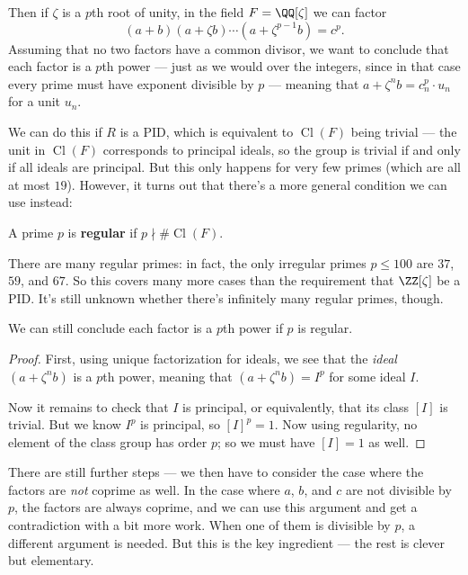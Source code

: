 Then if $\zeta$ is a $p$th root of unity, in the field $F = \QQ[\zeta]$ we can factor \[(a + b)(a + \zeta b)\cdots (a + \zeta^{p - 1}b) = c^p.\] Assuming that no two factors have a common divisor, we want to conclude that each factor is a $p$th power --- just as we would over the integers, since in that case every prime must have exponent divisible by $p$ --- meaning that $a + \zeta^nb = c_n^p \cdot u_n$ for a unit $u_n$. 

We can do this if $R$ is a PID, which is equivalent to $\operatorname{Cl}(F)$ being trivial --- the unit in $\operatorname{Cl}(F)$ corresponds to principal ideals, so the group is trivial if and only if all ideals are principal. But this only happens for very few primes (which are all at most $19$). However, it turns out that there's a more general condition we can use instead:

\begin{definition}
    A prime $p$ is \textbf{regular} if $p \nmid \#\operatorname{Cl}(F)$. 
\end{definition}

There are many regular primes: in fact, the only irregular primes $p \leq 100$ are $37$, $59$, and $67$. So this covers many more cases than the requirement that $\ZZ[\zeta]$ be a PID. It's still unknown whether there's infinitely many regular primes, though.

\begin{proposition}
    We can still conclude each factor is a $p$th power if $p$ is regular. 
\end{proposition}

\begin{proof}
    First, using unique factorization for ideals, we see that the \emph{ideal} $(a + \zeta^nb)$ is a $p$th power, meaning that $(a + \zeta^nb) = I^p$ for some ideal $I$. 
    
    Now it remains to check that $I$ is principal, or equivalently, that its class $[I]$ is trivial. But we know $I^p$ is principal, so $[I]^p = 1$. Now using regularity, no element of the class group has order $p$; so we must have $[I] = 1$ as well. 
\end{proof}

There are still further steps --- we then have to consider the case where the factors are \emph{not} coprime as well. In the case where $a$, $b$, and $c$ are not divisible by $p$, the factors are always coprime, and we can use this argument and get a contradiction with a bit more work. When one of them is divisible by $p$, a different argument is needed. But this is the key ingredient --- the rest is clever but elementary. 

